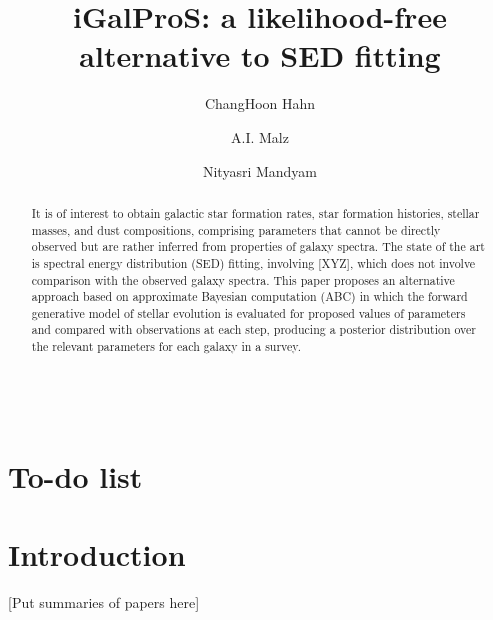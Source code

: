 \documentclass[12pt, onecolumn]{emulateapj}
\begin{document}
\begin{align}
\end{align}

\title{iGalProS: a likelihood-free alternative to SED fitting}

\author{ChangHoon Hahn}
\author{A.I. Malz}
\author{Nityasri Mandyam}

\begin{abstract}
It is of interest to obtain galactic star formation rates, star formation histories, stellar masses, and dust compositions, comprising parameters that cannot be directly observed but are rather inferred from properties of galaxy spectra.  The state of the art is spectral energy distribution (SED) fitting, involving [XYZ], which does not involve comparison with the observed galaxy spectra.  This paper proposes an alternative approach based on approximate Bayesian computation (ABC) in which the forward generative model of stellar evolution is evaluated for proposed values of parameters and compared with observations at each step, producing a posterior distribution over the relevant parameters for each galaxy in a survey.
\end{abstract}


\section*{To-do list}
\begin{enumerate}
\end{enumerate}

\section{Introduction}

[Put summaries of papers here]

\acknowledgments{}

\appendix{}


\end{document}
